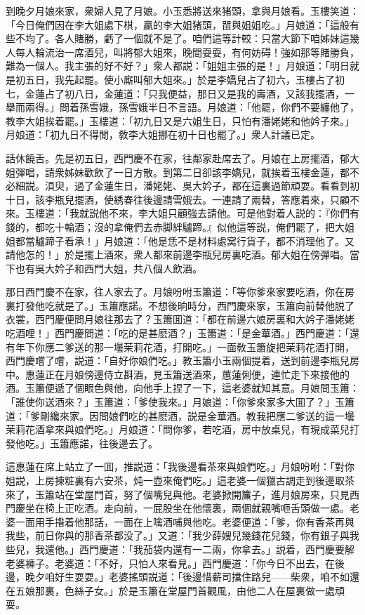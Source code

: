 到晚夕月娘來家，衆婦人見了月娘。小玉悉將送來猪頭，拿與月娘看。玉樓笑道：「今日俺們因在李大姐處下棋，贏的李大姐猪頭，㽞與姐姐吃。」月娘道：「這般有些不均了。各人賭勝，虧了一個就不是了。咱們這等計較：只當大節下咱姊妹這幾人每人輪流治一席酒兒，叫將郁大姐來，晚間耍耍，有何妨碍！強如那等賭勝負，難為一個人。我主張的好不好？」衆人都説：「姐姐主張的是！」月娘道：「明日就是初五日，我先起罷。使小廝叫郁大姐來。」於是李嬌兒占了初六，玉樓占了初七，金蓮占了初八日，金蓮道：「只我便益，那日又是我的壽酒，又該我擺酒，一擧而兩得。」問着孫雪娥，孫雪娥半日不言語。月娘道：「他罷，你們不要纏他了，教李大姐挨着罷。」玉樓道：「初九日又是六姐生日，只怕有潘姥姥和他妗子來。」月娘道：「初九日不得閒，敎李大姐挪在初十日也罷了。」衆人計議已定。

話休饒舌。先是初五日，西門慶不在家，往鄰家赴席去了。月娘在上房擺酒，郁大姐彈唱，請衆姊妹歡飲了一日方散。到第二日卻該李嬌兒，就挨着玉樓金蓮，都不必細説。湏臾，過了金蓮生日，潘姥姥、吳大妗子，都在這裏過節頑耍。看看到初十日，該李瓶兒擺酒，使綉春往後邊請雪娥去。一連請了兩替，答應着來，只顧不來。玉樓道：「我就説他不來，李大姐只顧強去請他。可是他對着人説的：『你們有錢的，都吃十輪酒；沒的拿俺們去赤脚絆驢蹄。』似他這等説，俺們罷了，把大姐姐都當驢蹄子看承！」月娘道：「他是恁不是材料處窝行貨子，都不消理他了。又請他怎的！」於是擺上酒來，衆人都來前邊李瓶兒房裏吃酒。郁大姐在傍彈唱。當下也有吳大妗子和西門大姐，共八個人飲酒。

那日西門慶不在家，往人家去了。月娘吩咐玉簫道：「等你爹來家要吃酒，你在房裏打發他吃就是了。」玉簫應諾。不想後晌時分，西門慶來家，玉簫向前替他脱了衣裳，西門慶便問月娘往那去了？玉簫囬道：「都在前邊六娘房裏和大妗子潘姥姥吃酒哩！」西門慶問道：「吃的是甚麽酒？」玉簫道：「是金華酒。」西門慶道：「還有年下你應二爹送的那一壜茉莉花酒，打開吃。」一面敎玉簫旋把茉莉花酒打開，西門慶嚐了嚐，説道：「自好你娘們吃。」教玉簫小玉兩個提着，送到前邊李瓶兒房中。惠蓮正在月娘傍邊侍立斟酒，見玉簫送酒來，蕙蓮俐便，連忙走下來接他的酒。玉簫便遞了個眼色與他，向他手上捏了一下，這老婆就知其意。月娘問玉簫：「誰使你送酒來？」玉簫道：「爹使我來。」月娘道：「你爹來家多大囬了？」玉簫道：「爹剛纔來家。因問娘們吃的甚麽酒，説是金華酒。教我把應二爹送的這一壜茉莉花酒拿來與娘們吃。」月娘道：「問你爹，若吃酒，房中放桌兒，有現成菜兒打發他吃。」玉簫應諾，往後邊去了。

這惠蓮在席上站立了一囬，推説道：「我後邊看茶來與娘們吃。」月娘吩咐：「對你姐説，上房揀粧裏有六安茶，炖一壺來俺們吃。」這老婆一個獵古調走到後邊取茶來了，玉簫站在堂屋門首，努了個嘴兒與他。老婆掀開簾子，進月娘房來，只見西門慶坐在椅上正吃酒。走向前，一屁股坐在他懷裏，兩個就親嘴咂舌頭做一處。老婆一面用手揝着他那話，一面在上噙酒哺與他吃。老婆便道：「爹，你有香茶再與我些，前日你與的那香茶都没了。」又道：「我少薛嫂兒幾錢花兒錢，你有銀子與我些兒，我還他。」西門慶道：「我茄袋内還有一二兩，你拿去。」説着，西門慶要解老婆褲子。老婆道：「不好，只怕人來看見。」西門慶道：「你今日不出去，在後邊，晚夕咱好生耍耍。」老婆搖頭説道：「後邊惜薪司擋住路兒——柴衆，咱不如還在五娘那裏，色絲子女。」於是玉簫在堂屋門首觀風，由他二人在屋裏做一處頑耍。

